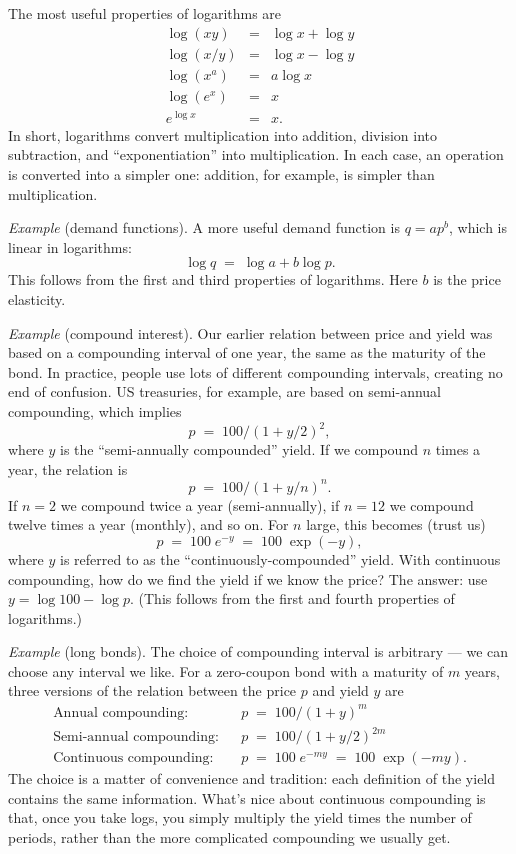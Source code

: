 \documentclass[letterpaper,12pt]{article}
\begin{document}
The most useful properties of logarithms are
\begin{eqnarray*}
    \log (xy) &=& \log x + \log y  \\
    \log (x/y) &=& \log x - \log y    \\
    \log (x^a) &=& a \log x  \\
    \log (e^x) &=& x \\
    e^{\log x} &=& x .
\end{eqnarray*}
In short, logarithms convert multiplication into addition, division into subtraction,
and ``exponentiation'' into multiplication.
In each case, an operation is converted into a simpler one:
addition, for example, is simpler than multiplication.


{\it Example} (demand functions).
A more useful demand function is $ q = a p^b $,
which is linear in logarithms:
\[
    \log q \;=\; \log a + b \log p .
\]
This follows from the first and third properties of logarithms.
Here $b$ is the price elasticity.


{\it Example} (compound interest).
Our earlier relation between price and yield
was based on a compounding interval of one year,
the same as the maturity of the bond.
In practice, people use lots of different compounding intervals,
creating no end of confusion.
US treasuries, for example, are based on semi-annual compounding,
which implies
\[
    p \;=\; 100/(1+y/2)^2,
\]
where $y$ is the ``semi-annually compounded'' yield.
If we compound $n$ times a year, the relation is
\[
    p \;=\; 100/(1+y/n)^n .
\]
If $n = 2$ we compound twice a year (semi-annually),
if $n=12$ we compound twelve times a year (monthly),
and so on.
For $n$ large, this becomes (trust us)
\[
    p \;=\; 100 \; e^{-y} \;=\; 100 \; \exp(-y) ,
\]
where $y$ is referred to as the ``continuously-compounded'' yield.
With continuous compounding, how do we find the yield if we know the price?
The answer:  use $ y = \log 100 - \log p$.
(This follows from the first and fourth properties of logarithms.)


{\it Example} (long bonds). The choice of compounding interval is
arbitrary --- we can choose any interval we like. For a
zero-coupon bond with a maturity of $m$ years, three versions of
the relation between the price $p$ and yield $y$ are
\begin{eqnarray*}
 \mbox{Annual compounding:} &&  p \;=\; 100/(1+y)^m  \\
 \mbox{Semi-annual compounding:}  &&    p \;=\; 100/(1+y/2)^{2m} \\
 \mbox{Continuous compounding:} &&  p \;=\; 100 \; e^{-m y} \;=\; 100 \; \exp(-my) .
\end{eqnarray*}
The choice is a matter of convenience and tradition:
each definition of the yield contains the same information.
What's nice about continuous compounding is that, once you take logs,
you simply multiply the yield times the number of periods,
rather than the more complicated compounding we usually get.
\end{document}

